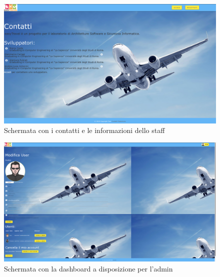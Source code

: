 \documentclass[11pt]{article}
\begin{document}
\begin{figure}[!ht]
	\includegraphics[width=1\textwidth]{./Mockup/Contatti} %
	\caption{Schermata con i contatti e le informazioni dello staff}
	\label{fig:contatti}
\end{figure}

\begin{figure}[!ht]
	\includegraphics[width=1\textwidth]{./Mockup/Dashboard-admin} %
	\caption{Schermata con la dashboard a disposizione per l'admin}
	\label{fig:profiloadmin}
\end{figure}
\end{document}
